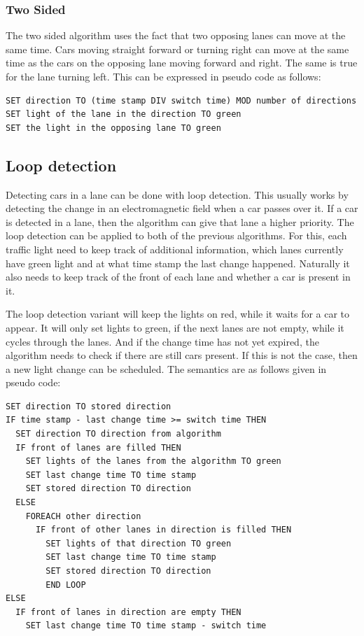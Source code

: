 \documentclass[a4paper,11pt]{article}
\begin{document}
\subsubsection*{Two Sided}
The two sided algorithm uses the fact that two opposing lanes can move at the same time.
Cars moving straight forward or turning right can move at the same time as the cars on the opposing lane moving forward and right.
The same is true for the lane turning left.
This can be expressed in pseudo code as follows:

\begin{lstlisting}
SET direction TO (time stamp DIV switch time) MOD number of directions
SET light of the lane in the direction TO green
SET the light in the opposing lane TO green
\end{lstlisting}

\subsection*{Loop detection}
Detecting cars in a lane can be done with loop detection.
This usually works by detecting the change in an electromagnetic field when a car passes over it.
If a car is detected in a lane, then the algorithm can give that lane a higher priority.
The loop detection can be applied to both of the previous algorithms.
For this, each traffic light need to keep track of additional information, which lanes currently have green light
and at what time stamp the last change happened.
Naturally it also needs to keep track of the front of each lane and whether a car is present in it.

The loop detection variant will keep the lights on red, while it waits for a car to appear.
It will only set lights to green, if the next lanes are not empty, while it cycles through the lanes.
And if the change time has not yet expired, the algorithm needs to check if there are still cars present.
If this is not the case, then a new light change can be scheduled.
The semantics are as follows given in pseudo code:

\begin{lstlisting}
SET direction TO stored direction
IF time stamp - last change time >= switch time THEN
  SET direction TO direction from algorithm
  IF front of lanes are filled THEN
    SET lights of the lanes from the algorithm TO green
    SET last change time TO time stamp
    SET stored direction TO direction
  ELSE
    FOREACH other direction
      IF front of other lanes in direction is filled THEN
        SET lights of that direction TO green
        SET last change time TO time stamp
        SET stored direction TO direction
        END LOOP
ELSE
  IF front of lanes in direction are empty THEN
    SET last change time TO time stamp - switch time
\end{lstlisting}
\end{document}
